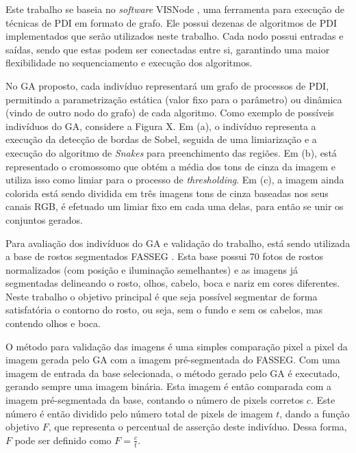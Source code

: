\documentclass[12pt,oneside,a4paper,english,french,spanish,brazil,]{abntex2}
\begin{document}
Este trabalho se baseia no \textit{software} VISNode \cite{visnode}, uma ferramenta para execução de técnicas de PDI em formato de grafo. Ele possui dezenas de algoritmos de PDI implementados que serão utilizados neste trabalho. Cada nodo possui entradas e saídas, sendo que estas podem ser conectadas entre si, garantindo uma maior flexibilidade no sequenciamento e execução dos algoritmos.

No GA proposto, cada indivíduo representará um grafo de processos de PDI, permitindo a parametrização estática (valor fixo para o parâmetro) ou dinâmica (vindo de outro nodo do grafo) de cada algoritmo. Como exemplo de possíveis indivíduos do GA, considere a Figura X. Em (a), o indivíduo representa a execução da detecção de bordas de Sobel, seguida de uma limiarização e a execução do algoritmo de \textit{Snakes} para preenchimento das regiões. Em (b), está representado o cromossomo que obtém a média dos tons de cinza da imagem e utiliza isso como limiar para o processo de \textit{thresholding}. Em (c), a imagem ainda colorida está sendo dividida em três imagens tons de cinza baseadas nos seus canais RGB, é efetuado um limiar fixo em cada uma delas, para então se unir os conjuntos gerados.

Para avaliação dos indivíduos do GA e validação do trabalho, está sendo utilizada a base de rostos segmentados FASSEG \cite{fasseg}. Esta base possui 70 fotos de rostos normalizados (com posição e iluminação semelhantes) e as imagens já segmentadas delineando o rosto, olhos, cabelo, boca e nariz em cores diferentes. Neste trabalho o objetivo principal é que seja possível segmentar de forma satisfatória o contorno do rosto, ou seja, sem o fundo e sem os cabelos, mas contendo olhos e boca.

O método para validação das imagens é uma simples comparação pixel a pixel da imagem gerada pelo GA com a imagem pré-segmentada do FASSEG. Com uma imagem de entrada da base selecionada, o método gerado pelo GA é executado, gerando sempre uma imagem binária. Esta imagem é então comparada com a imagem pré-segmentada da base, contando o número de pixels corretos \(c\). Este número é então dividido pelo número total de pixels de imagem \(t\), dando a função objetivo \(F\), que representa o percentual de asserção deste indivíduo. Dessa forma, \(F\) pode ser definido como \(F = \frac{c}{t}\).
\end{document}

